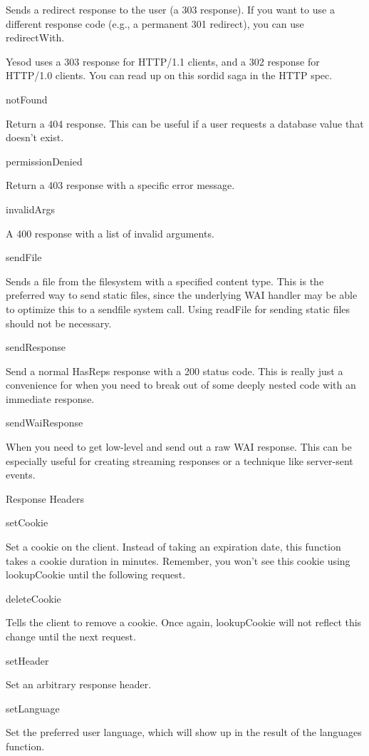 Sends a redirect response to the user (a 303 response). If you want to
use a different response code (e.g., a permanent 301 redirect), you
can use redirectWith.

Yesod uses a 303 response for HTTP/1.1 clients, and a 302 response for
HTTP/1.0 clients. You can read up on this sordid saga in the HTTP
spec.

notFound

Return a 404 response. This can be useful if a user requests a
database value that doesn't exist.

permissionDenied

Return a 403 response with a specific error message.

invalidArgs

A 400 response with a list of invalid arguments.

sendFile

Sends a file from the filesystem with a specified content type. This
is the preferred way to send static files, since the underlying WAI
handler may be able to optimize this to a sendfile system call. Using
readFile for sending static files should not be necessary.

sendResponse

Send a normal HasReps response with a 200 status code. This is really
just a convenience for when you need to break out of some deeply
nested code with an immediate response.

sendWaiResponse

When you need to get low-level and send out a raw WAI response. This
can be especially useful for creating streaming responses or a
technique like server-sent events.

Response Headers

setCookie

Set a cookie on the client. Instead of taking an expiration date, this
function takes a cookie duration in minutes. Remember, you won't see
this cookie using lookupCookie until the following request.

deleteCookie

Tells the client to remove a cookie. Once again, lookupCookie will not
reflect this change until the next request.

setHeader

Set an arbitrary response header.

setLanguage

Set the preferred user language, which will show up in the result of
the languages function.

